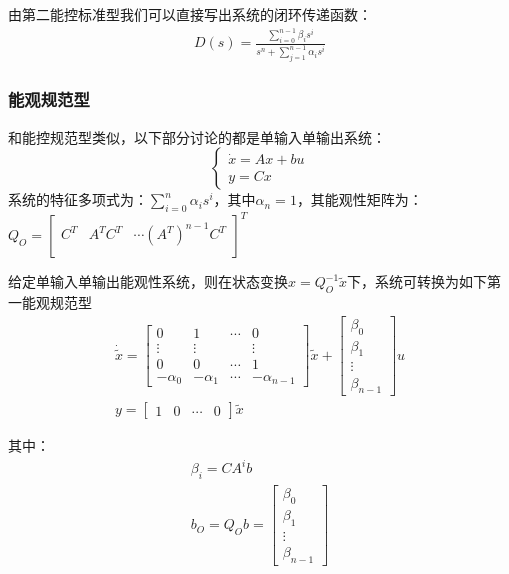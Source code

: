 \begin{theorem}[第二能控性规范型]
    由第二能控标准型我们可以直接写出系统的闭环传递函数：
    \begin{gather*}
        D(s) = \frac{\sum\limits_{i=0}^{n-1} \beta_i s^i}{s^n + \sum\limits_{j=1}^{n-1} \alpha_i s^i}
    \end{gather*}
\end{theorem}

\subsubsection{能观规范型}

和能控规范型类似，以下部分讨论的都是单输入单输出系统：
\begin{equation*}
    \begin{cases}
        \dot{x} = A x + b u \\
        y = C x
    \end{cases}
\end{equation*}
系统的特征多项式为：$\sum\limits_{i=0}^n \alpha_i s^i$，其中$\alpha_n = 1$，其能观性矩阵为：$Q_O = \begin{bmatrix}
    C^T & A^T C^T & \cdots (A^T)^{n-1} C^T \\
\end{bmatrix}^T$

\begin{theorem}[第一能观规范型]
    给定单输入单输出能观性系统，则在状态变换$x = Q_O^{-1} \tilde{x}$下，系统可转换为如下第一能观规范型
    \begin{gather*}
        \dot{\tilde{x}} = \begin{bmatrix}
            0 & 1 & \cdots & 0 \\
            \vdots & \vdots & & \vdots \\
            0 & 0 & \cdots & 1 \\
            -\alpha_0 & -\alpha_1 &  \cdots & -\alpha_{n-1}
        \end{bmatrix} \tilde{x} + \begin{bmatrix}
            \beta_0 \\ \beta_1 \\ \vdots \\ \beta_{n-1}
        \end{bmatrix} u \\
        y = \begin{bmatrix}
            1 & 0 & \cdots & 0
        \end{bmatrix} \tilde{x}
    \end{gather*}

    其中：
    \begin{gather*}
        \beta_i = C A^i b\\
        b_O = Q_O b = \begin{bmatrix}
            \beta_0 \\ \beta_1 \\ \vdots \\ \beta_{n-1}
        \end{bmatrix}
    \end{gather*}
\end{theorem}

